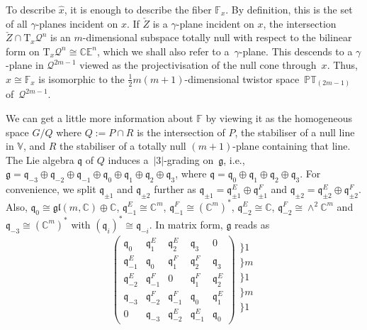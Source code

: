\documentclass[10pt,a4paper]{amsart}
\numberwithin{equation}{section}
\newcommand{\mc} [1]{\mathcal{#1}}
\newcommand{\Tgt} {\mathrm{T}}
\newcommand{\glie} {\mathfrak{gl}}
\newcommand{\g} {\mathfrak{g}}
\newcommand{\mfq} {\mathfrak{q}}
\newcommand{\PT} {\mathbb{PT}}
\newcommand{\E} {\mathbb{E}}
\newcommand{\C} {\mathbb{C}}
\newcommand{\F} {\mathbb{F}}
\newcommand{\V} {\mathbb{V}}
\begin{document}
To describe $\hat{x}$, it is enough to describe the f\/iber $\F_x$. By def\/inition, this is the set of all $\gamma$-planes incident on $x$. If $\check{Z}$ is a $\gamma$-plane incident on $x$, the intersection~$\check{Z} \cap \Tgt_x \mc{Q}^n$ is an $m$-dimensional subspace totally null with respect to the bilinear form on $\Tgt_x \mc{Q}^n \cong \C \E^n$, which we shall also refer to a~$\gamma$-plane. This descends to a $\gamma$-plane in $\mc{Q}^{2m-1}$ viewed as the projectivisation of the null cone through~$x$. Thus, $\hat{x} \cong \F_x$ is isomorphic to the $\frac{1}{2}m(m+1)$-dimensional twistor space~$\PT_{(2m-1)}$ of~$\mc{Q}^{2m-1}$.

We can get a little more information about $\F$ by viewing it as the homogeneous space $G/Q$ where $Q:=P \cap R$ is the intersection of $P$, the stabiliser of a null line in $\V$, and $R$ the stabiliser of a totally null $(m+1)$-plane containing that line. The Lie algebra $\mfq$ of $Q$ induces a~$|3|$-grading on~$\g$, i.e., $\g = \mfq_{-3} \oplus \mfq_{-2} \oplus \mfq_{-1} \oplus \mfq_0 \oplus \mfq_1 \oplus \mfq_2 \oplus \mfq_3$, where $\mfq = \mfq_0 \oplus \mfq_1 \oplus \mfq_2 \oplus \mfq_3$. For convenience, we split $\mfq_{\pm1}$ and $\mfq_{\pm2}$ further as $\mfq_{\pm1} = \mfq_{\pm1}^E \oplus \mfq_{\pm1}^F$ and $\mfq_{\pm2} = \mfq_{\pm2}^E \oplus \mfq_{\pm2}^F$. Also, $\mfq_0 \cong \glie(m,\C) \oplus \C$, $\mfq_{-1}^E \cong \C^m$, $\mfq_{-1}^F \cong (\C^m)^*$, $\mfq_{-2}^E \cong \C$, $\mfq_{-2}^F \cong \wedge^2 \C^m$ and $\mfq_{-3} \cong (\C^m)^*$ with $(\mfq_i)^* \cong \mfq_{-i}$. In matrix form, $\g$ reads as
\begin{gather*}
\left(
 \begin{array}{c|c|c|c|c}
\mfq_0 & \mfq_1^E & \mfq_2^E & \mfq_3 & 0 \\\hline 
\mfq_{-1}^E & \mfq_0 & \mfq_1^F & \mfq_2^F & \mfq_3 \\\hline 
\mfq_{-2}^E & \mfq_{-1}^F & 0 & \mfq_1^F & \mfq_2^E \\\hline 
\mfq_{-3} & \mfq_{-2}^F & \mfq_{-1}^F & \mfq_0 & \mfq_1^E \\\hline 
0 & \mfq_{-3} & \mfq_{-2}^E & \mfq_{-1}^E & \mfq_0
\end{array} \right)
\begin{array}{l}
\} \scriptscriptstyle{1} \\ \} \scriptscriptstyle{m} \\ \} \scriptscriptstyle{1} \\ \} \scriptscriptstyle{m} \\ \} \scriptscriptstyle{1} \\
\end{array}
\end{gather*}
\end{document}

